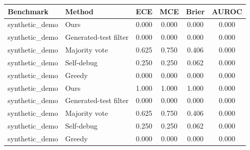 \begin{tabular}{llcccc}
\toprule
Benchmark & Method & ECE & MCE & Brier & AUROC \\
\midrule
synthetic_demo & Ours & 0.000 & 0.000 & 0.000 & 0.000 \\
synthetic_demo & Generated-test filter & 0.000 & 0.000 & 0.000 & 0.000 \\
synthetic_demo & Majority vote & 0.625 & 0.750 & 0.406 & 0.000 \\
synthetic_demo & Self-debug & 0.250 & 0.250 & 0.062 & 0.000 \\
synthetic_demo & Greedy & 0.000 & 0.000 & 0.000 & 0.000 \\
synthetic_demo & Ours & 1.000 & 1.000 & 1.000 & 0.000 \\
synthetic_demo & Generated-test filter & 0.000 & 0.000 & 0.000 & 0.000 \\
synthetic_demo & Majority vote & 0.625 & 0.750 & 0.406 & 0.000 \\
synthetic_demo & Self-debug & 0.250 & 0.250 & 0.062 & 0.000 \\
synthetic_demo & Greedy & 0.000 & 0.000 & 0.000 & 0.000 \\
\bottomrule
\end{tabular}
